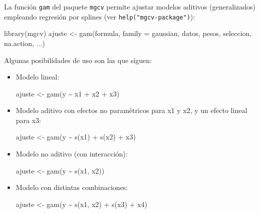 \documentclass[
]{book}
\newenvironment{Shaded}{\begin{snugshade}}{\end{snugshade}}
\newcommand{\AttributeTok}[1]{\textcolor[rgb]{0.77,0.63,0.00}{#1}}
\newcommand{\FunctionTok}[1]{\textcolor[rgb]{0.00,0.00,0.00}{#1}}
\newcommand{\NormalTok}[1]{#1}
\newcommand{\OtherTok}[1]{\textcolor[rgb]{0.56,0.35,0.01}{#1}}
\newcommand{\SpecialCharTok}[1]{\textcolor[rgb]{0.00,0.00,0.00}{#1}}
\theoremstyle{break}
\begin{document}
La función \texttt{gam} del paquete \texttt{mgcv} permite ajustar modelos aditivos (generalizados) empleando regresión por splines (ver \texttt{help("mgcv-package")}):

\begin{Shaded}
\begin{Highlighting}[]
\FunctionTok{library}\NormalTok{(mgcv)}
\NormalTok{ajuste }\OtherTok{\textless{}{-}} \FunctionTok{gam}\NormalTok{(formula, }\AttributeTok{family =}\NormalTok{ gaussian, datos, pesos, seleccion, na.action, ...)}
\end{Highlighting}
\end{Shaded}

Algunas posibilidades de uso son las que siguen:

\begin{itemize}
\item
  Modelo lineal:

\begin{Shaded}
\begin{Highlighting}[]
\NormalTok{ajuste }\OtherTok{\textless{}{-}} \FunctionTok{gam}\NormalTok{(y }\SpecialCharTok{\textasciitilde{}}\NormalTok{ x1 }\SpecialCharTok{+}\NormalTok{ x2 }\SpecialCharTok{+}\NormalTok{ x3)}
\end{Highlighting}
\end{Shaded}
\item
  Modelo aditivo con efectos no paramétricos para x1 y x2, y un efecto lineal para x3:

\begin{Shaded}
\begin{Highlighting}[]
\NormalTok{ajuste }\OtherTok{\textless{}{-}} \FunctionTok{gam}\NormalTok{(y }\SpecialCharTok{\textasciitilde{}} \FunctionTok{s}\NormalTok{(x1) }\SpecialCharTok{+} \FunctionTok{s}\NormalTok{(x2) }\SpecialCharTok{+}\NormalTok{ x3)}
\end{Highlighting}
\end{Shaded}
\item
  Modelo no aditivo (con interacción):

\begin{Shaded}
\begin{Highlighting}[]
\NormalTok{ajuste }\OtherTok{\textless{}{-}} \FunctionTok{gam}\NormalTok{(y }\SpecialCharTok{\textasciitilde{}} \FunctionTok{s}\NormalTok{(x1, x2))}
\end{Highlighting}
\end{Shaded}
\item
  Modelo con distintas combinaciones:

\begin{Shaded}
\begin{Highlighting}[]
\NormalTok{ajuste }\OtherTok{\textless{}{-}} \FunctionTok{gam}\NormalTok{(y }\SpecialCharTok{\textasciitilde{}} \FunctionTok{s}\NormalTok{(x1, x2) }\SpecialCharTok{+} \FunctionTok{s}\NormalTok{(x3) }\SpecialCharTok{+}\NormalTok{ x4)}
\end{Highlighting}
\end{Shaded}
\end{itemize}
\end{document}
